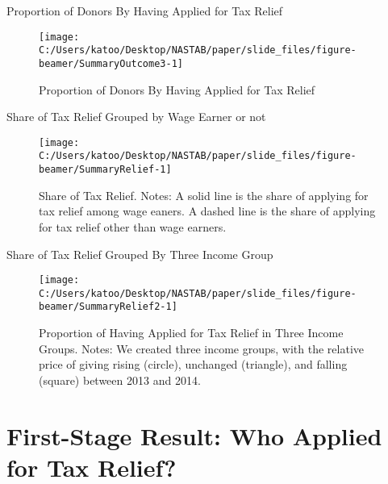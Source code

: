 \documentclass[
  ignorenonframetext,
  aspectratio=169,
]{beamer}
\begin{document}
\begin{frame}{Proportion of Donors By Having Applied for Tax Relief}
\protect\hypertarget{proportion-of-donors-by-having-applied-for-tax-relief}{}
\begin{figure}[t]

{\centering \texttt{[image: C:/Users/katoo/Desktop/NASTAB/paper/slide\_files/figure-beamer/SummaryOutcome3-1]} 

}

\caption{Proportion of Donors By Having Applied for Tax Relief}\label{fig:SummaryOutcome3}
\end{figure}
\end{frame}

\begin{frame}{Share of Tax Relief Grouped by Wage Earner or not}
\protect\hypertarget{share-of-tax-relief-grouped-by-wage-earner-or-not}{}
\begin{figure}[t]

{\centering \texttt{[image: C:/Users/katoo/Desktop/NASTAB/paper/slide\_files/figure-beamer/SummaryRelief-1]} 

}

\caption{Share of Tax Relief. Notes: A solid line is the share of applying for tax relief among wage eaners. A dashed line is the share of applying for tax relief other than wage earners.}\label{fig:SummaryRelief}
\end{figure}
\end{frame}

\begin{frame}{Share of Tax Relief Grouped By Three Income Group}
\protect\hypertarget{share-of-tax-relief-grouped-by-three-income-group}{}
\begin{figure}[t]

{\centering \texttt{[image: C:/Users/katoo/Desktop/NASTAB/paper/slide\_files/figure-beamer/SummaryRelief2-1]} 

}

\caption{Proportion of Having Applied for Tax Relief in Three Income Groups. Notes: We created three income groups, with the relative price of giving rising (circle), unchanged (triangle), and falling (square) between 2013 and 2014.}\label{fig:SummaryRelief2}
\end{figure}
\end{frame}

\hypertarget{first-stage-result-who-applied-for-tax-relief}{%
\section{First-Stage Result: Who Applied for Tax Relief?}\label{first-stage-result-who-applied-for-tax-relief}}
\end{document}
